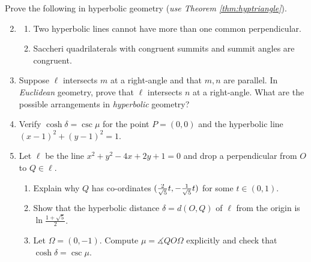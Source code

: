 \vspace{-8pt}


\goodbreak


\begin{exercises}
	\exstart Prove the following in hyperbolic geometry (\emph{use Theorem \ref{thm:hyptriangle}}).\par\vspace{-2pt}
	\begin{enumerate}\setcounter{enumi}{1}
	  \item[]\begin{enumerate}
	    \item Two hyperbolic lines cannot have more than one common perpendicular.
	    \item\label{exs:saccherisummitcong} Saccheri quadrilaterals with congruent summits and summit angles are congruent.
	  \end{enumerate}
	   
	  
	  \item Suppose $\ell$ intersects $m$ at a right-angle and that $m,n$ are parallel. In \emph{Euclidean} geometry, prove that $\ell$ intersects $n$ at a right-angle. What are the possible arrangements in \emph{hyperbolic} geometry?
	  
	  
	  \item Verify $\cosh\delta=\csc\mu$ for the point $P=(0,0)$ and the hyperbolic line $(x-1)^2+(y-1)^2=1$.
	  
	  
	  \item Let $\ell$ be the line $x^2+y^2-4x+2y+1=0$ and drop a perpendicular from $O$ to $Q\in\ell$.
	  \begin{enumerate}
	    \item Explain why $Q$ has co-ordinates $(\smash{\frac 2{\sqrt 5}t,-\frac 1{\sqrt 5}t})$ for some $t\in(0,1)$.
	    \item Show that the hyperbolic distance $\delta=d(O,Q)$ of $\ell$ from the origin is $\ln\frac{1+\sqrt 5}2$.
	    \item Let $\Omega=(0,-1)$. Compute $\mu=\measuredangle QO\Omega$ explicitly and check that $\cosh\delta=\csc\mu$.
		\end{enumerate}
		

\end{enumerate}
\end{exercises}

